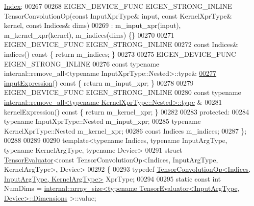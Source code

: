 \begin{DoxyCode}
       \hyperlink{namespace_eigen_a62e77e0933482dafde8fe197d9a2cfde}{Index};
00267 
00268   EIGEN\_DEVICE\_FUNC EIGEN\_STRONG\_INLINE TensorConvolutionOp(\textcolor{keyword}{const} InputXprType& input, \textcolor{keyword}{const} KernelXprType&
       kernel, \textcolor{keyword}{const} Indices& dims)
00269       : m\_input\_xpr(input), m\_kernel\_xpr(kernel), m\_indices(dims) \{\}
00270 
00271     EIGEN\_DEVICE\_FUNC EIGEN\_STRONG\_INLINE
00272     \textcolor{keyword}{const} Indices& indices()\textcolor{keyword}{ const }\{ \textcolor{keywordflow}{return} m\_indices; \}
00273 
00275     EIGEN\_DEVICE\_FUNC EIGEN\_STRONG\_INLINE
00276     \textcolor{keyword}{const} \textcolor{keyword}{typename} internal::remove\_all<typename InputXprType::Nested>::type&
\hyperlink{class_eigen_1_1_tensor_convolution_op_a57097fbe6e0a033d587e98654f0bd664}{00277}     \hyperlink{class_eigen_1_1_tensor_convolution_op_a57097fbe6e0a033d587e98654f0bd664}{inputExpression}()\textcolor{keyword}{ const }\{ \textcolor{keywordflow}{return} m\_input\_xpr; \}
00278 
00279     EIGEN\_DEVICE\_FUNC EIGEN\_STRONG\_INLINE
00280     \textcolor{keyword}{const} \textcolor{keyword}{typename} \hyperlink{group___sparse_core___module}{internal::remove\_all<typename KernelXprType::Nested>::type}
      &
00281     kernelExpression()\textcolor{keyword}{ const }\{ \textcolor{keywordflow}{return} m\_kernel\_xpr; \}
00282 
00283   \textcolor{keyword}{protected}:
00284     \textcolor{keyword}{typename} InputXprType::Nested m\_input\_xpr;
00285     \textcolor{keyword}{typename} KernelXprType::Nested m\_kernel\_xpr;
00286     \textcolor{keyword}{const} Indices m\_indices;
00287 \};
00288 
00289 
00290 \textcolor{keyword}{template}<\textcolor{keyword}{typename} Indices, \textcolor{keyword}{typename} InputArgType, \textcolor{keyword}{typename} KernelArgType, \textcolor{keyword}{typename} Device>
00291 \textcolor{keyword}{struct }\hyperlink{struct_eigen_1_1_tensor_evaluator}{TensorEvaluator}<const TensorConvolutionOp<Indices, InputArgType, KernelArgType>, 
      Device>
00292 \{
00293   \textcolor{keyword}{typedef} \hyperlink{class_eigen_1_1_tensor_convolution_op}{TensorConvolutionOp<Indices, InputArgType, KernelArgType>}
       XprType;
00294 
00295   \textcolor{keyword}{static} \textcolor{keyword}{const} \textcolor{keywordtype}{int} NumDims = 
      \hyperlink{struct_eigen_1_1internal_1_1array__size}{internal::array\_size<typename TensorEvaluator<InputArgType, Device>::Dimensions}
      >::value;

\end{DoxyCode}
